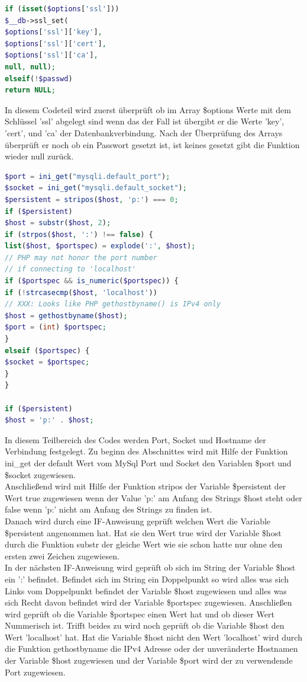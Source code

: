 \newpage

\begin{lstlisting}[language=PHP, caption=mysqli.php/function-db\_connect2, firstnumber=32]
if (isset($options['ssl']))
$__db->ssl_set(
$options['ssl']['key'],
$options['ssl']['cert'],
$options['ssl']['ca'],
null, null);
elseif(!$passwd)
return NULL;
\end{lstlisting}
In diesem Codeteil wird zuerst überprüft ob im Array \$options Werte mit dem Schlüssel 'ssl' abgelegt sind wenn das der Fall ist übergibt er die Werte 'key', 'cert', und 'ca' der Datenbankverbindung. Nach der Überprüfung des Arrays überprüft er noch ob ein Passwort gesetzt ist, ist keines gesetzt gibt die Funktion wieder null zurück.

\newpage

\begin{lstlisting}[language=PHP, caption=mysqli.php/function-db\_connect3, firstnumber=41]
$port = ini_get("mysqli.default_port");
$socket = ini_get("mysqli.default_socket");
$persistent = stripos($host, 'p:') === 0;
if ($persistent)
$host = substr($host, 2);
if (strpos($host, ':') !== false) {
list($host, $portspec) = explode(':', $host);
// PHP may not honor the port number 
// if connecting to 'localhost'
if ($portspec && is_numeric($portspec)) {
if (!strcasecmp($host, 'localhost'))
// XXX: Looks like PHP gethostbyname() is IPv4 only
$host = gethostbyname($host);
$port = (int) $portspec;
}
elseif ($portspec) {
$socket = $portspec;
}
}

if ($persistent)
$host = 'p:' . $host;
\end{lstlisting}

In diesem Teilbereich des Codes werden Port, Socket und Hostname der Verbindung festgelegt. Zu beginn des Abschnittes wird mit Hilfe der Funktion ini\_get der default Wert vom MySql Port und Socket den Variablen \$port und \$socket zugewiesen.\\
Anschließend wird mit Hilfe der Funktion stripos der Variable \$persistent der Wert true zugewiesen wenn der Value 'p:' am Anfang des Strings \$host steht oder false wenn 'p:' nicht am Anfang des Strings zu finden ist.\\
Danach wird durch eine IF-Anweisung geprüft welchen Wert die Variable \$persistent angenommen hat. Hat sie den Wert true wird der Variable \$host durch die Funktion substr der gleiche Wert wie sie schon hatte nur ohne den ersten zwei Zeichen zugewiesen.\\
In der nächsten IF-Anweisung wird geprüft ob sich im String der Variable \$host ein ':' befindet. Befindet sich im String ein Doppelpunkt so wird alles was sich Links vom Doppelpunkt befindet der Variable \$host zugewiesen und alles was sich Recht davon befindet wird der Variable \$portspec zugewiesen. Anschließen wird geprüft ob die Variable \$portspec einen Wert hat und ob dieser Wert Nummerisch ist. Trifft beides zu wird noch geprüft ob die Variable \$host den Wert 'localhost' hat. Hat die Variable \$host nicht den Wert 'localhost' wird durch die Funktion gethostbyname die IPv4 Adresse oder der unveränderte Hostnamen der Variable \$host zugewiesen und der Variable \$port wird der zu verwendende Port zugewiesen.

